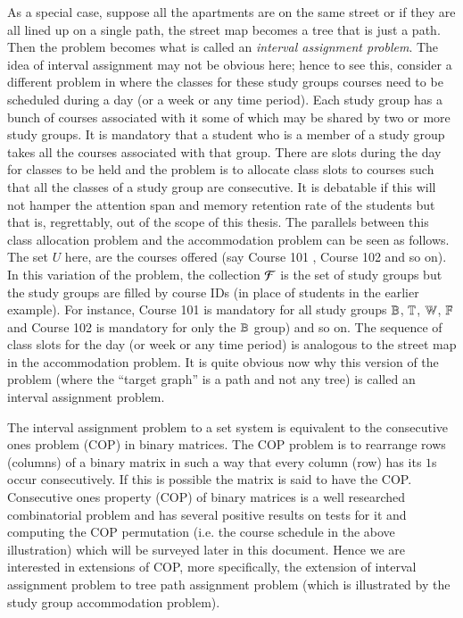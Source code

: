 \documentclass[MS,synopsis]{iitmdiss}
\begin{document}
As a special case, suppose all the apartments are on the same street
or if they are all lined up on a single path, the street map becomes a
tree that is just a path. Then the problem becomes what is called an
{\em interval assignment problem}. The idea of interval assignment may
not be obvious here; hence to see this, consider a different problem
in {\WSI} where the classes for these study groups courses need to be
scheduled during a day (or a week or any time period). Each study
group has a bunch of courses associated with it some of which may be
shared by two or more study groups. It is mandatory that a student who
is a member of a study group takes all the courses associated with
that group. There are slots during the day for classes to be held and
the problem is to allocate class slots to courses such that all the
classes of a study group are consecutive. It is debatable if this will
not hamper the attention span and memory retention rate of the
students but that is, regrettably, out of the scope of this
thesis. The parallels between this class allocation problem and the
accommodation problem can be seen as follows. The set $U$ here, are
the courses offered (say Course 101 {\coneohone}, Course 102
{\coneohtwo} and so on). In this variation of the problem, the
collection ${\cal F}$ is the set of study groups but the study groups are
filled by course IDs (in place of students in the earlier
example). For instance, Course 101 is mandatory for all study groups
$\mathbb{B}$, $\mathbb{T}$, $\mathbb{W}$, $\mathbb{F}$ and Course 102 is mandatory for
only the $\mathbb{B}$ group) and so on. The sequence of class slots for the
day (or week or any time period) is analogous to the street map in the
accommodation problem. It is quite obvious now why this version of the
problem (where the ``target graph'' is a path and not any
tree) is called an interval assignment
problem.

The interval assignment problem to a set system is equivalent to the
consecutive ones problem (COP) in binary matrices\cite{wlh02,
  nsnrs09}.  The COP problem is to rearrange rows (columns) of a
binary matrix in such a way that every column (row) has its $1$s occur
consecutively. If this is possible the matrix is said to have the COP.
Consecutive ones property (COP) of binary matrices is a well
researched combinatorial problem and has several positive results on
tests for it and computing the COP permutation (i.e. the course
schedule in the above illustration) which will be surveyed later in
this document. Hence we are interested in extensions of COP, more
specifically, the extension of interval assignment problem to tree
path assignment problem (which is illustrated by the study group
accommodation problem).
\end{document}
